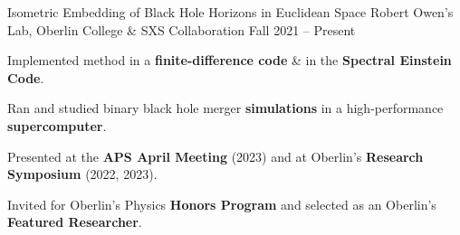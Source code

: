\begin{entry}{Isometric Embedding of Black Hole Horizons in Euclidean Space}
	\entryItem
		{Robert Owen's Lab, Oberlin College \& SXS Collaboration}
		{Fall 2021 -- Present}

		\begin{items}
			\item Implemented method in a \textbf{finite-difference code} \hspace*{-0.1cm}\hspace*{-0.1cm} \& in the \textbf{Spectral Einstein Code}.
			\item Ran and studied binary black hole merger \textbf{simulations} in a high-performance \textbf{supercomputer}.
			\item Presented at the \textbf{APS April Meeting} (2023) and at Oberlin's \textbf{Research Symposium} (2022, 2023).
			\item Invited for Oberlin's Physics \textbf{Honors Program} and selected as an Oberlin's \textbf{Featured Researcher}.
		\end{items}
\end{entry}
